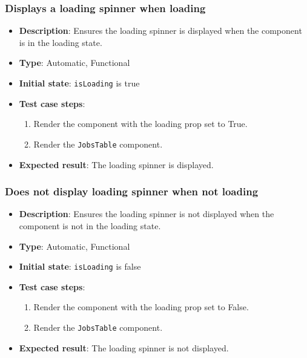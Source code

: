 \documentclass[12pt, titlepage]{article}
\begin{document}
\subsubsection{Displays a loading spinner when loading}
\begin{itemize}
    \item \textbf{Description}: Ensures the loading spinner is displayed when the component is in the loading state.
    \item \textbf{Type}: Automatic, Functional
    \item \textbf{Initial state}: \texttt{isLoading} is true
    \item \textbf{Test case steps}:
    \begin{enumerate}
        \item Render the component with the loading prop set to True.
        \item Render the \texttt{JobsTable} component.
    \end{enumerate}
    \item \textbf{Expected result}: The loading spinner is displayed.
\end{itemize}

\subsubsection{Does not display loading spinner when not loading}
\begin{itemize}
    \item \textbf{Description}: Ensures the loading spinner is not displayed when the component is not in the loading state.
    \item \textbf{Type}: Automatic, Functional
    \item \textbf{Initial state}: \texttt{isLoading} is false
    \item \textbf{Test case steps}:
    \begin{enumerate}
        \item Render the component with the loading prop set to False.
        \item Render the \texttt{JobsTable} component.
    \end{enumerate}
    \item \textbf{Expected result}: The loading spinner is not displayed.
\end{itemize}
\end{document}

